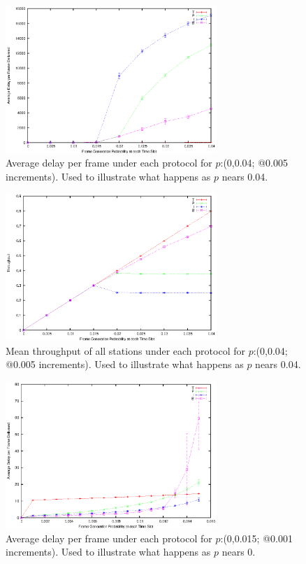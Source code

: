 \documentclass[twocolumn]{article}
\begin{document}
\begin{figure}
    \centering \includegraphics[width=8cm]{plots/delay_big.eps}
    \caption{\footnotesize  Average delay per frame under each protocol for
    $p$:(0,0.04; @0.005 increments). Used to illustrate what happens as $p$
    nears 0.04.} \label{fig:delay_big}
\end{figure}

\begin{figure}
    \centering \includegraphics[width=8cm]{plots/throughput_big.eps}
    \caption{\footnotesize Mean throughput of all stations under each protocol
    for $p$:(0,0.04; @0.005 increments). Used to illustrate what happens as $p$
    nears 0.04.} \label{fig:throughput_big}
\end{figure}

\begin{figure}
    \centering \includegraphics[width=8cm]{plots/small_delay.eps}
    \caption{\footnotesize Average delay per frame under each protocol for
    $p$:(0,0.015; @0.001 increments). Used to illustrate what happens as $p$
    nears 0.} \label{fig:delay_small}
\end{figure}
\end{document}
